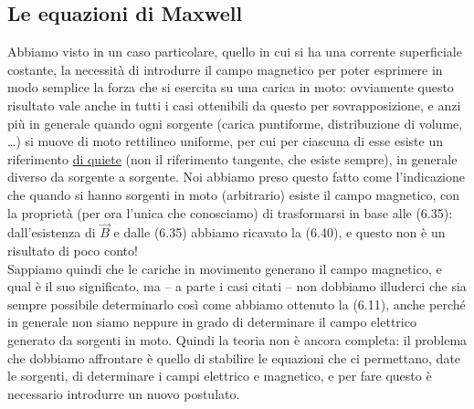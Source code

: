 \subsection{Le equazioni di Maxwell}

Abbiamo visto in un caso particolare, quello in cui si ha una corrente
superficiale costante, la necessit\`a di introdurre il campo magnetico per poter
esprimere in modo semplice la forza che si esercita su una carica in moto:
ovviamente questo risultato vale anche in tutti i casi ottenibili da questo per
sovrapposizione, e anzi pi\`u in generale quando ogni sorgente (carica
puntiforme, distribuzione di volume, \dots) si muove di moto rettilineo
uniforme, per cui per ciascuna di esse esiste un riferimento \underline{di
quiete} (non il riferimento tangente, che esiste sempre), in generale diverso da
sorgente a sorgente. Noi abbiamo preso questo fatto come l'indicazione che
quando si hanno sorgenti in moto (arbitrario) esiste il campo magnetico, con la
propriet\`a (per ora l'unica che conosciamo) di trasformarsi in base alle
(6.35): dall'esistenza di $\vec B$ e dalle (6.35) abbiamo ricavato la (6.40), e
questo non \`e un risultato di poco conto!\\
Sappiamo quindi che le cariche in movimento generano il campo magnetico, e qual
\`e il suo significato, ma -- a parte i casi citati -- non dobbiamo illuderci
che sia sempre possibile determinarlo cos\`i come abbiamo ottenuto la (6.11),
anche perch\'e in generale non siamo neppure in grado di determinare il campo
elettrico generato da sorgenti in moto. Quindi la teoria non \`e ancora
completa: il problema che dobbiamo affrontare \`e quello di stabilire le
equazioni che ci permettano, date le sorgenti, di determinare i campi elettrico
e magnetico, e per fare questo \`e necessario introdurre un nuovo postulato.

